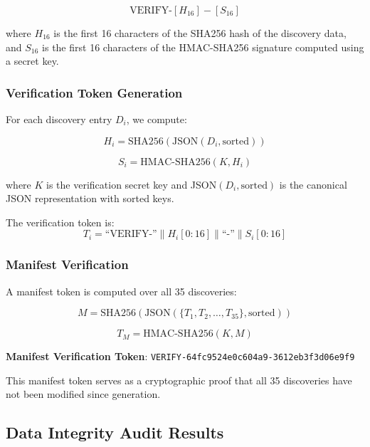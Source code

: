 \documentclass[11pt,a4paper]{article}
\begin{document}
\begin{equation}
\text{VERIFY-}[H_{16}]-[S_{16}]
\end{equation}

where $H_{16}$ is the first 16 characters of the SHA256 hash of the discovery data, and $S_{16}$ is the first 16 characters of the HMAC-SHA256 signature computed using a secret key.

\subsubsection{Verification Token Generation}

For each discovery entry $D_i$, we compute:

\begin{equation}
H_i = \text{SHA256}(\text{JSON}(D_i, \text{sorted}))
\end{equation}

\begin{equation}
S_i = \text{HMAC-SHA256}(K, H_i)
\end{equation}

where $K$ is the verification secret key and JSON$(D_i, \text{sorted})$ is the canonical JSON representation with sorted keys.

The verification token is:
\begin{equation}
T_i = \text{``VERIFY-''} \| H_i[0:16] \| \text{``-''} \| S_i[0:16]
\end{equation}

\subsubsection{Manifest Verification}

A manifest token is computed over all 35 discoveries:

\begin{equation}
M = \text{SHA256}(\text{JSON}(\{T_1, T_2, \ldots, T_{35}\}, \text{sorted}))
\end{equation}

\begin{equation}
T_M = \text{HMAC-SHA256}(K, M)
\end{equation}

\textbf{Manifest Verification Token}: \texttt{VERIFY-64fc9524e0c604a9-3612eb3f3d06e9f9}

This manifest token serves as a cryptographic proof that all 35 discoveries have not been modified since generation.

\subsection{Data Integrity Audit Results}
\end{document}
